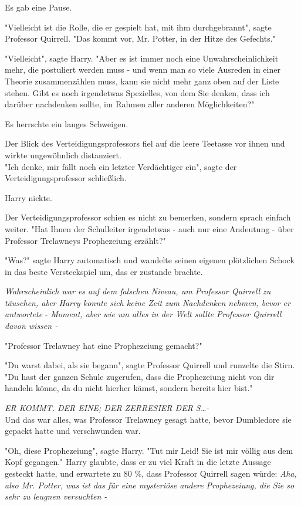 {Es gab eine Pause.

"Vielleicht ist die Rolle, die er gespielt hat, mit ihm durchgebrannt", sagte Professor Quirrell. "Das kommt vor, Mr. Potter, in der Hitze des Gefechts."

"Vielleicht", sagte Harry. "Aber es ist immer noch eine Unwahrscheinlichkeit mehr, die postuliert werden muss - und wenn man so viele Ausreden in einer Theorie zusammenzählen muss, kann sie nicht mehr ganz oben auf der Liste stehen. Gibt es noch irgendetwas Spezielles, von dem Sie denken, dass ich darüber nachdenken sollte, im Rahmen aller anderen Möglichkeiten?"

Es herrschte ein langes Schweigen.

Der Blick des Verteidigungsprofessors fiel auf die leere Teetasse vor ihnen und wirkte ungewöhnlich distanziert.\\ "Ich denke, mir fällt noch ein letzter Verdächtiger ein", sagte der Verteidigungsprofessor schließlich.

Harry nickte.

Der Verteidigungsprofessor schien es nicht zu bemerken, sondern sprach einfach weiter. "Hat Ihnen der Schulleiter irgendetwas - auch nur eine Andeutung - über Professor Trelawneys Prophezeiung erzählt?"

"Was?" sagte Harry automatisch und wandelte seinen eigenen plötzlichen Schock in das beste Versteckspiel um, das er zustande brachte.

\emph{Wahrscheinlich war es auf dem falschen Niveau, um Professor Quirrell zu täuschen, aber Harry konnte sich keine Zeit zum Nachdenken nehmen, bevor er antwortete} - \emph{Moment, aber wie um alles in der Welt sollte Professor Quirrell davon wissen -}

"Professor Trelawney hat eine Prophezeiung gemacht?"

"Du warst dabei, als sie begann", sagte Professor Quirrell und runzelte die Stirn. "Du hast der ganzen Schule zugerufen, dass die Prophezeiung nicht von dir handeln könne, da du nicht hierher kämst, sondern bereits hier bist."

\emph{ER KOMMT. DER EINE; DER ZERRESIER DER S…-}\\ Und das war alles, was Professor Trelawney gesagt hatte, bevor Dumbledore sie gepackt hatte und verschwunden war.

"Oh, diese Prophezeiung", sagte Harry. "Tut mir Leid! Sie ist mir völlig aus dem Kopf gegangen." Harry glaubte, dass er zu viel Kraft in die letzte Aussage gesteckt hatte, und erwartete zu 80 \%, dass Professor Quirrell sagen würde: \emph{Aha, also Mr. Potter, was ist das für eine mysteriöse andere Prophezeiung, die Sie so sehr zu leugnen versuchten -}

}
